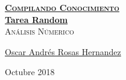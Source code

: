 \documentclass[12pt, fleqn]{article}                            %
\author{Oscar Andrés Rosas}                                     %
\theoremstyle{break}                                            %
\begin{document}
\begin{titlepage}
    
    \pagecolor{TitlePageColor}                                      %
    \color{white}                                                   %

    \vspace                                                         %
    \baselineskip                                                   %

    \makebox[0pt][l]{\rule{1.3\textwidth}{3pt}}                     %
    
    \href{https://compilandoconocimiento.com}                       %
    {\textbf{\textsc{\Huge Compilando Conocimiento}}}\\[2.7cm]      %

    \href{\ProjectNameLink}                                         %
    {\fontsize{65}{78}\selectfont \textbf{Tarea Random}}\\[0.5cm]   %
    \textcolor{ColorSubtext}{\textsc{\Huge Análisis Númerico}}      %
    
    \vfill                                                          %
    
    \href{\ProjectAuthorLink}                                       %
    {\LARGE \textsf{Oscar Andrés Rosas Hernandez}}                  %

    \vspace                                                         %
    \baselineskip                                                   %
    
    {\large \textsf{Octubre 2018}}                                  %
\end{titlepage}


\restoregeometry                                                    %
\nopagecolor                                                        %
\end{document}
